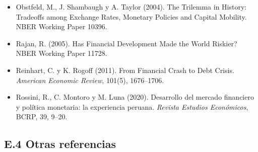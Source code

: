 \documentclass[11pt,a4paper]{article}
\begin{document}
{\begin{itemize}[leftmargin=1.4em,itemsep=1pt,label={}]
\item Obstfeld, M., J. Shambaugh y A. Taylor (2004). The Trilemma in History: Tradeoffs among Exchange Rates, Monetary Policies and Capital Mobility. NBER Working Paper 10396.
\item Rajan, R. (2005). Has Financial Development Made the World Riskier? NBER Working Paper 11728.
\item Reinhart, C. y K. Rogoff (2011). From Financial Crash to Debt Crisis. \emph{American Economic Review}, 101(5), 1676--1706.
\item Rossini, R., C. Montoro y M. Luna (2020). Desarrollo del mercado financiero y política monetaria: la experiencia peruana. \emph{Revista Estudios Económicos}, BCRP, 39, 9--20.
\end{itemize}
}

\subsection*{E.4 Otras referencias}
\end{document}
